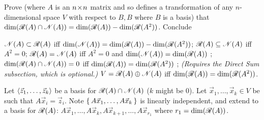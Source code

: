 \begin{exercises}
\begin{answer}
    \end{answer}
  \item  
    Prove
    (where \( A \) is an \( n \! \times \! n \) matrix and so defines
    a transformation of any \( n \)-dimensional space \( V \)
    with respect to \( B,B \) where \( B \) is a basis) that
    \( \dim(\mathscr{R}(A)\cap\mathscr{N}(A))
           =\dim(\mathscr{R}(A))-\dim(\mathscr{R}(A^2)) \).
    Conclude
    \begin{exparts}
      \partsitem \( \mathscr{N}(A)\subset\mathscr{R}(A) \)
            iff
            \( \dim(\mathscr{N}(A))=\dim(\mathscr{R}(A))
                                   -\dim(\mathscr{R}(A^2)) \);
      \partsitem \( \mathscr{R}(A)\subseteq\mathscr{N}(A) \)
            iff
            \( A^2=0 \);
      \partsitem \( \mathscr{R}(A)=\mathscr{N}(A) \)
            iff
            \( A^2=0 \)
            and \( \dim(\mathscr{N}(A))=\dim(\mathscr{R}(A)) \) ;
      \partsitem \( \dim(\mathscr{R}(A)\cap\mathscr{N}(A))=0 \)
            iff
            \( \dim(\mathscr{R}(A))=\dim(\mathscr{R}(A^2)) \) ;
      \partsitem \textit{(Requires the Direct Sum subsection, 
            which is optional.)}
            \( V=\mathscr{R}(A)\oplus\mathscr{N}(A) \)
            iff
            \( \dim(\mathscr{R}(A))=\dim(\mathscr{R}(A^2)) \).
    \end{exparts}
    \cite{Monthly55p721}
    \begin{answer}
      \answerasgiven
      Let \( \langle\vec{z}_1,\dots,\vec{z}_k\rangle \) be a basis for
      \( \mathscr{R}(A)\cap\mathscr{N}(A) \)
      (\( k \) might be \( 0 \)).
      Let \( \vec{x}_1,\dots,\vec{x}_k\in V \) be such that
      \( A\vec{x}_i=\vec{z}_i \).
      Note \( \mbox{$\{\,A\vec{x}_1,\dots,A\vec{x}_k\,\}$} \) is linearly independent,
      and extend to a basis for \( \mathscr{R}(A) \):
      \( A\vec{x}_1,\ldots,A\vec{x}_k,A\vec{x}_{k+1},\dots,A\vec{x}_{r_1} \)
      where \( r_1=\dim(\mathscr{R}(A)) \).


\end{answer}
\end{exercises}
